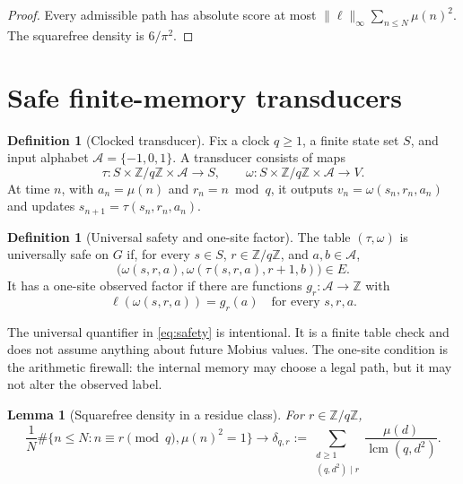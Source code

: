 \documentclass[11pt]{article}
\newtheorem{lemma}[theorem]{Lemma}
\theoremstyle{definition}
\newtheorem{definition}[theorem]{Definition}
\theoremstyle{remark}
\newcommand{\Mob}{\mu}
\newcommand{\ellobs}{\ell}
\begin{document}
\begin{proof}
Every admissible path has absolute score at most
\(\|\ellobs\|_\infty\sum_{n\leq N}\Mob(n)^2\).  The squarefree density is
\(6/\pi^2\).
\end{proof}

\section{Safe finite-memory transducers}

\begin{definition}[Clocked transducer]
Fix a clock \(q\geq1\), a finite state set \(S\), and input alphabet
\(\mathcal A=\{-1,0,1\}\).  A transducer consists of maps
\[
 \tau:S\times\mathbb Z/q\mathbb Z\times\mathcal A\to S,
 \qquad
 \omega:S\times\mathbb Z/q\mathbb Z\times\mathcal A\to V.
\]
At time \(n\), with \(a_n=\Mob(n)\) and \(r_n=n\bmod q\), it outputs
\(v_n=\omega(s_n,r_n,a_n)\) and updates
\(s_{n+1}=\tau(s_n,r_n,a_n)\).
\end{definition}

\begin{definition}[Universal safety and one-site factor]
The table \((\tau,\omega)\) is universally safe on \(G\) if, for every
\(s\in S\), \(r\in\mathbb Z/q\mathbb Z\), and \(a,b\in\mathcal A\),
\begin{equation}
\bigl(\omega(s,r,a),
 \omega(\tau(s,r,a),r+1,b)\bigr)\in E.
\label{eq:safety}
\end{equation}
It has a one-site observed factor if there are functions
\(g_r:\mathcal A\to\mathbb Z\) with
\begin{equation}
 \ellobs(\omega(s,r,a))=g_r(a)
 \quad\text{for every }s,r,a.
\label{eq:onesite}
\end{equation}
\end{definition}

The universal quantifier in \eqref{eq:safety} is intentional.  It is a
finite table check and does not assume anything about future Mobius values.
The one-site condition is the arithmetic firewall: the internal memory may
choose a legal path, but it may not alter the observed label.

\begin{lemma}[Squarefree density in a residue class]
For \(r\in\mathbb Z/q\mathbb Z\),
\begin{equation}
 \frac1N\#\{n\leq N:n\equiv r\pmod q,\Mob(n)^2=1\}
 \longrightarrow
 \delta_{q,r}:=
 \sum_{\substack{d\geq1\\(q,d^2)\mid r}}
 \frac{\Mob(d)}{\operatorname{lcm}(q,d^2)}.
\label{eq:delta}
\end{equation}
\end{lemma}
\end{document}
